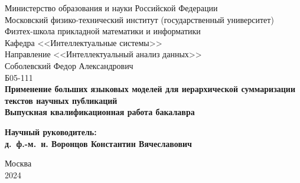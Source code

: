 \documentclass[12pt]{article}
\begin{document}
\thispagestyle{empty}
\begin{center}
    \sc
        Министерство образования и науки Российской Федерации\\
        Московский физико-технический институт
        {\rm(государственный университет)}\\
        Физтех-школа прикладной математики и информатики\\
        Кафедра <<Интеллектуальные системы>>\\
        Направление <<Интеллектуальный анализ данных>> \\[30mm]
    \rm\large
        Соболевский Федор Александрович\\
        Б05-111\\[10mm]
    \bf\Large
	Применение больших языковых моделей 
        для иерархической суммаризации
        текстов научных публикаций \\[10mm]
    \rm\normalsize
    \sc
        Выпускная квалификационная работа бакалавра\\[10mm]
\end{center}
\hfill\parbox{90mm}{
    \begin{flushleft}
    \bf
        Научный руководитель:\\
    \rm
        д.~ф.-м.~н. Воронцов Константин Вячеславович\\[5cm]
    \end{flushleft}
}
\begin{center}
    Москва\\
    2024
\end{center}


\newpage
\tableofcontents
\newpage
\end{document}
